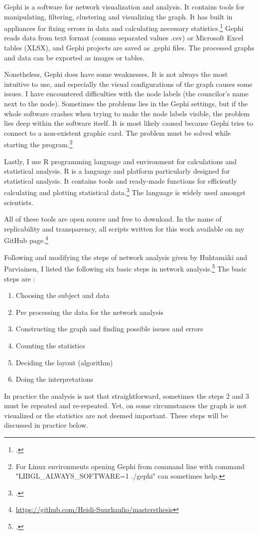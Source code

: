 Gephi is a software for network visualization and analysis. It contains tools for manipulating, filtering, clustering and visualizing the graph. It has built in appliances for fixing errors in data and calculating necessary statistics.\footcite{gephi} Gephi reads data from text format (comma separated values .csv) or Microsoft Excel tables (XLSX), and Gephi projects are saved as .gephi files. The processed graphs and data can be exported as images or tables.  

Nonetheless, Gephi does have some weaknesses. It is not always the most intuitive to use, and especially the visual configurations of the graph causes some issues. I have encountered difficulties with the node labels (the councilor's name next to the node). Sometimes the problems lies in the Gephi settings, but if the whole software crashes when trying to make the node labels visible, the problem lies deep within the software itself. It is most likely caused because Gephi tries to connect to a non-existent graphic card. The problem must be solved while starting the program.\footnote{For Linux environments opening Gephi from command line with command "LIBGL\_ALWAYS\_SOFTWARE=1 ./gephi" can sometimes help.} 

Lastly, I use R programming language and environment for calculations and statistical analysis. R is a language and platform particularly designed for statistical analysis. It contains tools and ready-made functions for efficiently calculating and plotting statistical data.\footcite{R} The language is widely used amongst scientists. 

All of these tools are open source and free to download. In the name of replicability and transparency, all scripts written for this work available on my GitHub page.\footnote{\url{https://github.com/Heidi-Suurkaulio/mastersthesis}}

Following and modifying the steps of network analysis given by Huhtamäki and Parviainen, I listed the following six  basic steps in network analysis.\footcite[p. 258]{huhtamakiEtAl} 
The basic steps are : \begin{enumerate}
	\item Choosing the subject and data
	\item Pre processing the data for the network analysis
	\item Constructing the graph and finding possible issues and errors 
	\item Counting the statistics
	\item Deciding the layout (algorithm)
	\item Doing the interpretations
\end{enumerate}
In practice the analysis is not that straightforward, sometimes the steps 2 and 3 must be repeated and re-repeated. Yet, on some circumstances the graph is not visualized or the statistics are not deemed important. These steps will be discussed in practice below.

